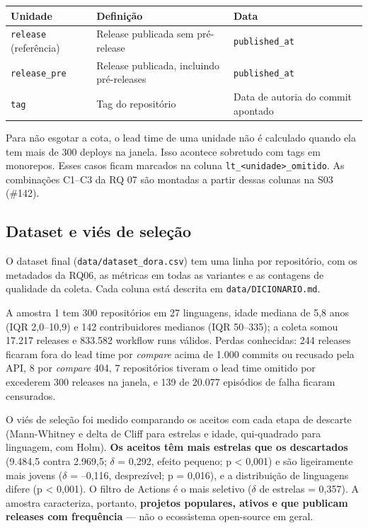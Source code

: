 \documentclass[12pt]{article}
\begin{document}
\begin{table}[!htbp]
\centering
\scriptsize
\begin{tabular}{p{}p{}p{}}
\toprule
\textbf{Unidade} & \textbf{Definição} & \textbf{Data} \\
\midrule
\texttt{release} (referência) & Release publicada sem pré-release & \texttt{published\_at} \\
\texttt{release\_pre} & Release publicada, incluindo pré-releases & \texttt{published\_at} \\
\texttt{tag} & Tag do repositório & Data de autoria do commit apontado \\
\bottomrule
\end{tabular}
\end{table}

Para não esgotar a cota, o lead time de uma unidade não é calculado quando ela tem mais de 300 deploys na janela. Isso acontece sobretudo com tags em monorepos. Esses casos ficam marcados na coluna \texttt{lt\_<unidade>\_omitido}. As combinações C1–C3 da RQ 07 são montadas a partir dessas colunas na S03 (\#142).

\subsection{Dataset e viés de seleção}

O dataset final (\texttt{data/dataset\_dora.csv}) tem uma linha por repositório, com os metadados da RQ06, as métricas em todas as variantes e as contagens de qualidade da coleta. Cada coluna está descrita em \texttt{data/DICIONARIO.md}.

A amostra 1 tem 300 repositórios em 27 linguagens, idade mediana de 5,8 anos (IQR 2,0–10,9) e 142 contribuidores medianos (IQR 50–335); a coleta somou 17.217 releases e 833.582 workflow runs válidos. Perdas conhecidas: 244 releases ficaram fora do lead time por \emph{compare} acima de 1.000 commits ou recusado pela API, 8 por \emph{compare} 404, 7 repositórios tiveram o lead time omitido por excederem 300 releases na janela, e 139 de 20.077 episódios de falha ficaram censurados.

O viés de seleção foi medido comparando os aceitos com cada etapa de descarte (Mann-Whitney e delta de Cliff para estrelas e idade, qui-quadrado para linguagem, com Holm). \textbf{Os aceitos têm mais estrelas que os descartados} (9.484,5 contra 2.969,5; $\delta$ = 0,292, efeito pequeno; p < 0,001) e são ligeiramente mais jovens ($\delta$ = --0,116, desprezível; p = 0,016), e a distribuição de linguagens difere (p < 0,001). O filtro de Actions é o mais seletivo ($\delta$ de estrelas = 0,357). A amostra caracteriza, portanto, \textbf{projetos populares, ativos e que publicam releases com frequência} — não o ecossistema open-source em geral.
\end{document}
